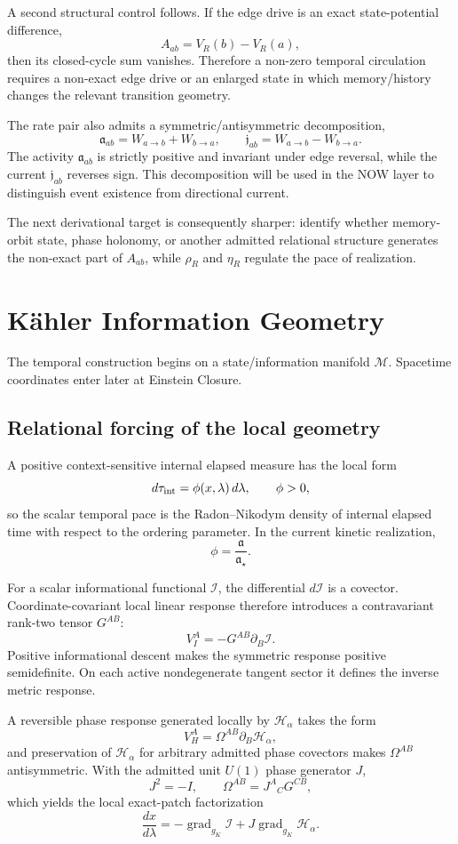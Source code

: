 \documentclass[11pt]{book}
\begin{document}
A second structural control follows. If the edge drive is an exact state-potential difference,
\[
A_{ab}=V_R(b)-V_R(a),
\]
then its closed-cycle sum vanishes. Therefore a non-zero temporal circulation requires a non-exact edge drive or an enlarged state in which memory/history changes the relevant transition geometry.

The rate pair also admits a symmetric/antisymmetric decomposition,
\[
\mathfrak a_{ab}=W_{a\to b}+W_{b\to a},
\qquad
\mathfrak j_{ab}=W_{a\to b}-W_{b\to a}.
\]
The activity $\mathfrak a_{ab}$ is strictly positive and invariant under edge reversal, while the current $\mathfrak j_{ab}$ reverses sign. This decomposition will be used in the NOW layer to distinguish event existence from directional current.

The next derivational target is consequently sharper: identify whether memory-orbit state, phase holonomy, or another admitted relational structure generates the non-exact part of $A_{ab}$, while $\rho_R$ and $\eta_R$ regulate the pace of realization.

\chapter{Kähler Information Geometry}
The temporal construction begins on a state/information manifold \(\mathcal M\). Spacetime coordinates enter later at Einstein Closure.

\section{Relational forcing of the local geometry}
A positive context-sensitive internal elapsed measure has the local form
\[
 d\tau_{\rm int}=\phi(x,\lambda)\,d\lambda,
 \qquad \phi>0,
\]
so the scalar temporal pace is the Radon--Nikodym density of internal elapsed time with respect to the ordering parameter. In the current kinetic realization,
\[
\boxed{\phi=\frac{\mathfrak a}{\mathfrak a_\star}.}
\]

For a scalar informational functional \(\mathcal I\), the differential \(d\mathcal I\) is a covector. Coordinate-covariant local linear response therefore introduces a contravariant rank-two tensor \(G^{AB}\):
\[
V_I^A=-G^{AB}\partial_B\mathcal I.
\]
Positive informational descent makes the symmetric response positive semidefinite. On each active nondegenerate tangent sector it defines the inverse metric response.

A reversible phase response generated locally by \(\mathcal H_\alpha\) takes the form
\[
V_H^A=\Omega^{AB}\partial_B\mathcal H_\alpha,
\]
and preservation of \(\mathcal H_\alpha\) for arbitrary admitted phase covectors makes \(\Omega^{AB}\) antisymmetric. With the admitted unit \(U(1)\) phase generator \(J\),
\[
J^2=-I,
\qquad
\Omega^{AB}=J^A{}_{C}G^{CB},
\]
which yields the local exact-patch factorization
\[
\boxed{
\frac{dx}{d\lambda}
=-\operatorname{grad}_{g_K}\mathcal I
+J\operatorname{grad}_{g_K}\mathcal H_\alpha.
}
\]
\end{document}
